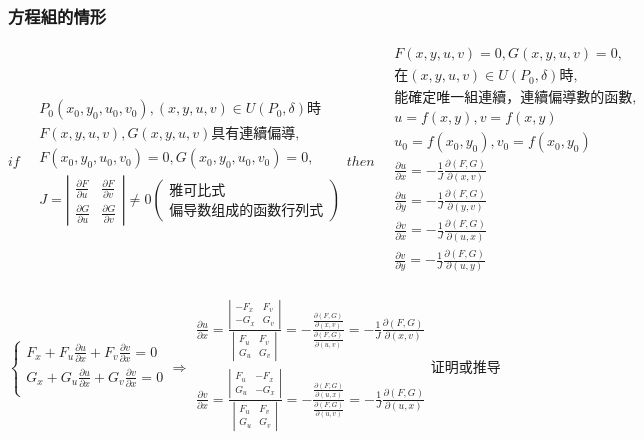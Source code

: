 \documentclass[UTF8]{ctexart}
\newcommand{\mt}[1]{\text{#1}}
\newcommand{\mf}[1]{\left( #1\right)}
\newcommand{\mfa}[1]{\left| #1\right|}
\newcommand{\q}{\quad}
\newcommand{\ma}[1]{\begin{array}{llll} #1 \end{array}}
\begin{document}
\subsubsection{方程組的情形}


$if \q \ma{
    P_0\mf{x_0,y_0,u_0,v_0},\mf{x,y,u,v} \in U\mf{P_0,\delta}\mt{時}\\
    F\mf{x,y,u,v}, G\mf{x,y,u,v}\mt{具有連續偏導},\\
    F\mf{x_0,y_0,u_0,v_0}=0,G\mf{x_0,y_0,u_0,v_0}=0,\\
    J=\mfa{\ma{
        \frac{\partial F}{\partial u}  &\frac{\partial F}{\partial v}\\
        \frac{\partial G}{\partial u}  &\frac{\partial G}{\partial v}
    }}\neq 0\left(\ma{\mt{雅可比式}\\ \mt{偏导数组成的函数行列式}}\right)
}then \q \ma{
    F\mf{x,y,u,v}=0,G\mf{x,y,u,v}=0,\\
    \mt{在} \mf{x,y,u,v} \in U\mf{P_0,\delta}\mt{時,}\\
    \mt{能確定唯一組連續，連續偏導數的函數},\\
    u=f\mf{x,y},v=f\mf{x,y}\\
    u_0=f\mf{x_0,y_0},v_0=f\mf{x_0,y_0}\\
    \frac{\partial u}{\partial x}=-\frac{1}{J}\frac{\partial\mf{F,G}}{\partial\mf{x,v}}  \\
    \frac{\partial u}{\partial y}= -\frac{1}{J}\frac{\partial\mf{F,G}}{\partial\mf{y,v}} \\
    \frac{\partial v}{\partial x}=-\frac{1}{J}\frac{\partial\mf{F,G}}{\partial\mf{u,x}}  \\
    \frac{\partial v}{\partial y}= -\frac{1}{J}\frac{\partial\mf{F,G}}{\partial\mf{u,y}} \\
}$

$\left\{ \ma{
    F_x+F_u\frac{\partial u}{\partial x}+F_v\frac{\partial v}{\partial x}=0\\
    G_x+G_u\frac{\partial u}{\partial x}+G_v\frac{\partial v}{\partial x}=0\\
}\right.\Rightarrow \ma{
    \frac{\partial u}{\partial x}=\frac{\mfa{\ma{-F_x & F_v\\-G_x & G_v}}}{\mfa{\ma{F_u & F_v\\G_u & G_v}}}=-\frac{\frac{\partial\mf{F,G}}{\partial\mf{x,v}}}{\frac{\partial\mf{F,G}}{\partial\mf{u,v}}}=-\frac{1}{J}\frac{\partial\mf{F,G}}{\partial\mf{x,v}}\\
    \frac{\partial v}{\partial x}=\frac{\mfa{\ma{F_u & -F_x\\G_u & -G_x}}}{\mfa{\ma{F_u & F_v\\G_u & G_v}}}=-\frac{\frac{\partial\mf{F,G}}{\partial\mf{u,x}}}{\frac{\partial\mf{F,G}}{\partial\mf{u,v}}}=-\frac{1}{J}\frac{\partial\mf{F,G}}{\partial\mf{u,x}}\\
}\mt{证明或推导}$
\end{document}
